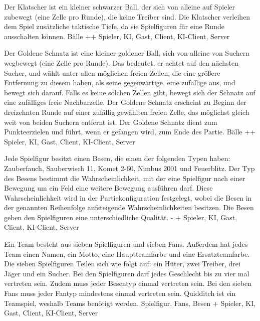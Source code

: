         {Der Klatscher ist ein kleiner schwarzer Ball, der sich von alleine auf Spieler zubewegt (eine Zelle pro Runde), die keine Treiber sind.}
        {Die Klatscher verleihen dem Spiel zusätzliche taktische Tiefe, da sie Spielfiguren für eine Runde ausschalten können.}
        {Bälle}
        {++}
        {Spieler, KI, Gast, Client, KI-Client, Server}

        {Der Goldene Schnatz ist eine kleiner goldener Ball, sich von alleine von Suchern wegbewegt (eine Zelle pro Runde). Das bedeutet, er achtet auf den nächsten Sucher, und wählt unter allen möglichen freien Zellen, die eine größere Entfernung zu diesem haben, als seine gegenwärtige, eine zufällige aus, und bewegt sich darauf. Falls es keine solchen Zellen gibt, bewegt sich der Schnatz auf eine zufälliges freie Nachbarzelle. Der Goldene
Schnatz erscheint zu Beginn der dreizehnten Runde auf einer zufällig gewählten freien Zelle, das möglichst gleich weit
von beiden Suchern entfernt ist.}
        {Der Goldene Schnatz dient zum Punkteerzielen und führt, wenn er gefangen wird, zum Ende des Partie.}
        {Bälle}
        {++}
        {Spieler, KI, Gast, Client, KI-Client, Server}

        {Jede Spielfigur besitzt einen Besen, die einen der folgenden Typen haben: Zauberfauch, Sauberwisch 11, Komet 2-60, Nimbus 2001 und Feuerblitz. Der Typ des Besens bestimmt die Wahrscheinlichkeit, mit der eine Spielfigur nach einer Bewegung um ein Feld eine weitere Bewegung ausführen darf. Diese Wahrscheinlichkeit wird in der Partiekonfiguration festgelegt, wobei die Besen in der genannten Reihenfolge aufsteigende Wahrscheinlichkeiten besitzen.}
        {Die Besen geben den Spielfiguren eine unterschiedliche Qualität.}
        {-}
        {+}
        {Spieler, KI, Gast, Client, KI-Client, Server}
        
        {Ein Team besteht aus sieben Spielfiguren und sieben Fans. Außerdem hat jedes Team einen Namen, ein Motto, eine Hauptteamfarbe und eine Ersatzteamfarbe. Die sieben Spielfiguren Teilen sich wie folgt auf:  ein Hüter, zwei Treiber, drei Jäger und ein Sucher. Bei den Spielfiguren darf jedes Geschlecht bis zu vier mal vertreten sein. Zudem muss jeder Besentyp einmal vertreten sein. Bei den sieben Fans muss jeder Fantyp mindestens einmal vertreten sein.}
        {Quidditch ist ein Teamspiel, weshalb Teams benötigt werden.}
        {Spielfigur, Fans, Besen}
        {+}
        {Spieler, KI, Gast, Client, KI-Client, Server}

